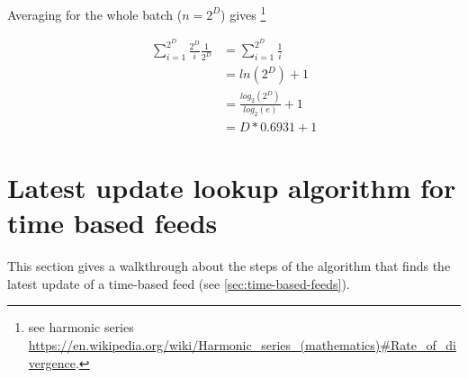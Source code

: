Averaging for the whole batch ($n=2^D$) gives%
%
\footnote{see harmonic series 
\url{https://en.wikipedia.org/wiki/Harmonic\_series\_(mathematics)\#Rate\_of\_divergence}.}

 \begin{subequations}   \begin{align}
\sum_{i=1}^{2^D}\frac{2^D}{i}\frac{1}{2^D}
&=\sum_{i=1}^{2^D}\frac{1}{i}\\
&=\mathit{ln}(2^D)+1\\
&=\frac{\mathit{log}_2(2^D)}{\mathit{log}_2(e)}+1\\
&=D*0.6931+1
\end{align} \end{subequations}


\section{Latest update lookup algorithm for time based feeds}\label{sec:feeds-lookup-algo}

This section gives a walkthrough about the steps of the algorithm that finds the latest update of a time-based feed  (see \ref{sec:time-based-feeds}).


